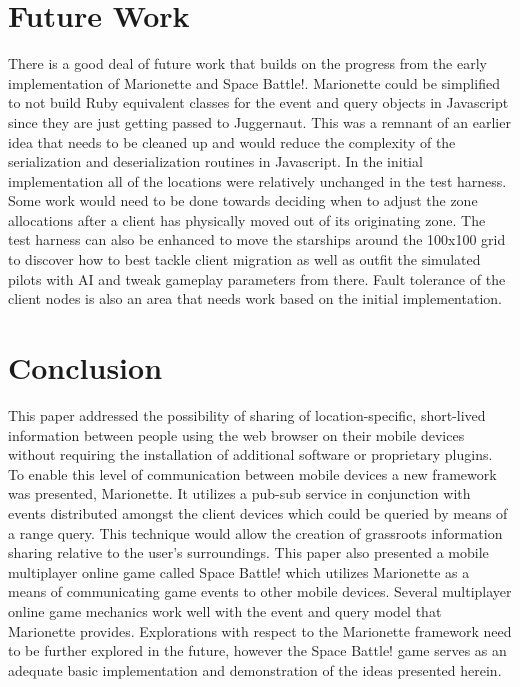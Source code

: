 \documentclass[12pt]{report}	%
\theoremstyle{definition}
\theoremstyle{remark}
\begin{document}
\chapter{Future Work}

There is a good deal of future work that builds on the progress from the
early implementation of Marionette and Space Battle!. Marionette could
be simplified to not build Ruby equivalent classes for the event and
query objects in Javascript since they are just getting passed to
Juggernaut. This was a remnant of an earlier idea that needs to be
cleaned up and would reduce the complexity of the serialization and
deserialization routines in Javascript. In the initial implementation
all of the locations were relatively unchanged in the test harness. Some
work would need to be done towards deciding when to adjust the zone
allocations after a client has physically moved out of its originating
zone. The test harness can also be enhanced to move the starships around
the 100x100 grid to discover how to best tackle client migration as well
as outfit the simulated pilots with AI and tweak gameplay parameters
from there. Fault tolerance of the client nodes is also an area that
needs work based on the initial implementation.

\chapter{Conclusion}

This paper addressed the possibility of sharing of location-specific,
short-lived information between people using the web browser on their
mobile devices without requiring the installation of additional software
or proprietary plugins. To enable this level of communication between
mobile devices a new framework was presented, Marionette. It utilizes a
pub-sub service in conjunction with events distributed amongst the
client devices which could be queried by means of a range query. This
technique would allow the creation of grassroots information sharing
relative to the user's surroundings. This paper also presented a mobile
multiplayer online game called Space Battle! which utilizes Marionette
as a means of communicating game events to other mobile devices. Several
multiplayer online game mechanics work well with the event and query
model that Marionette provides. Explorations with respect to the
Marionette framework need to be further explored in the future, however
the Space Battle! game serves as an adequate basic implementation and
demonstration of the ideas presented herein.
\end{document}
